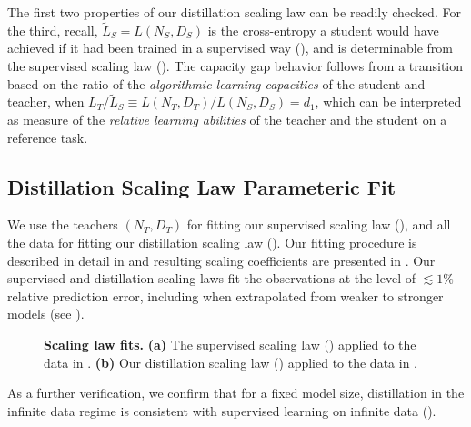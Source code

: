 The first two properties of our distillation scaling law can be readily checked.
For the third,
recall, $\widetilde{L}_S=L(N_S,D_S)$ is the cross-entropy a student would have achieved if it had been trained in a supervised way (), and is determinable from the supervised scaling law ().
The capacity gap behavior follows from a transition based on the ratio of the \emph{algorithmic learning capacities} of the student and teacher, when
$
        L_T/\widetilde{L}_S
	\equiv
        L(N_T,D_T)/L(N_S,D_S)
	=
	d_1
$,
which can be interpreted as measure of the \emph{relative learning abilities} of the teacher and the student on a reference task.

\subsection{Distillation Scaling Law Parameteric Fit}
\label{ssec:distillation-scaling-law-parameteric-fit}

We use the teachers $(N_T, D_T)$ for fitting our supervised scaling law (),
and all the data for fitting our distillation scaling law ().
Our fitting procedure is described in detail in 
and resulting scaling coefficients are presented in .
Our supervised and distillation scaling laws fit the observations at the level of $\lesssim1\%$ relative prediction error, including when extrapolated from weaker to stronger models (see ).


\begin{figure}[h]
	\centering
	\hfill
    \vspace{-0.1cm}
	\caption{\textbf{Scaling law fits.}
		\textbf{(a)} The supervised scaling law () applied to the data in .
		\textbf{(b)} Our distillation scaling law () applied to the data in .}
        \vspace{-0.2cm}
	\label{fig:scaling-law-fits}
\end{figure}

As a further verification, we confirm that for a fixed model size, distillation in the infinite data regime is consistent with supervised learning on infinite data ().
